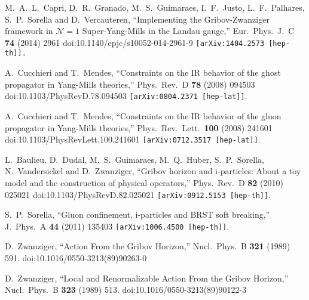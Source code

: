\documentclass[a4paper,11pt,british,twosides]{book}%
\numberwithin{equation}{section}
\begin{document}
\begin{thebibliography}{9}
  M.~A.~L.~Capri, D.~R.~Granado, M.~S.~Guimaraes, I.~F.~Justo, L.~F.~Palhares, S.~P.~Sorella and D.~Vercauteren,
  ``Implementing the Gribov-Zwanziger framework in $\mathcal {N}=1$ Super-Yang-Mills in the Landau gauge,''
  Eur.\ Phys.\ J.\ C {\bf 74} (2014) 2961
  doi:10.1140/epjc/s10052-014-2961-9
  {\tt [arXiv:1404.2573 [hep-th]].}

  A.~Cucchieri and T.~Mendes,
  ``Constraints on the IR behavior of the ghost propagator in Yang-Mills theories,''
  Phys.\ Rev.\ D {\bf 78} (2008) 094503
  doi:10.1103/PhysRevD.78.094503
  {\tt [arXiv:0804.2371 [hep-lat]]}.

  A.~Cucchieri and T.~Mendes,
  ``Constraints on the IR behavior of the gluon propagator in Yang-Mills theories,''
  Phys.\ Rev.\ Lett.\  {\bf 100} (2008) 241601
  doi:10.1103/PhysRevLett.100.241601
  {\tt [arXiv:0712.3517 [hep-lat]]}.

  L.~Baulieu, D.~Dudal, M.~S.~Guimaraes, M.~Q.~Huber, S.~P.~Sorella, N.~Vandersickel and
  D.~Zwanziger,
  ``Gribov horizon and i-particles: About a toy model and the construction of physical
  operators,''
  Phys.\ Rev.\ D {\bf 82} (2010) 025021
  doi:10.1103/PhysRevD.82.025021
  {\tt [arXiv:0912.5153 [hep-th]]}.


  S.~P.~Sorella,
  ``Gluon confinement, i-particles and BRST soft breaking,''
  J.\ Phys.\ A {\bf 44} (2011) 135403
  {\tt [arXiv:1006.4500 [hep-th]]}.

  D.~Zwanziger,
  ``Action From the Gribov Horizon,''
  Nucl.\ Phys.\ B {\bf 321} (1989) 591.
  doi:10.1016/0550-3213(89)90263-0

  D.~Zwanziger,
  ``Local and Renormalizable Action From the Gribov Horizon,''
  Nucl.\ Phys.\ B {\bf 323} (1989) 513.
  doi:10.1016/0550-3213(89)90122-3



\end{thebibliography}
\end{document}
